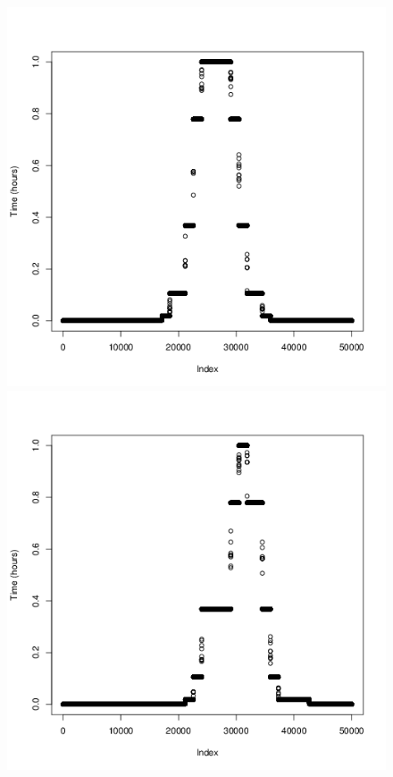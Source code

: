 \documentclass[a4paper, 12pt]{article}
\begin{document}
\begin{figure}[H]
\begin{minipage}[]{0.2\textwidth}
        \end{minipage}
        \begin{minipage}[]{0.2\textwidth}
             \includegraphics[width=\textwidth]{share/5_time.png}
        \end{minipage}
        \begin{minipage}[]{0.2\textwidth}
            \includegraphics[width=\textwidth]{share/6_time.png}

\end{minipage}
\end{figure}
\end{document}
